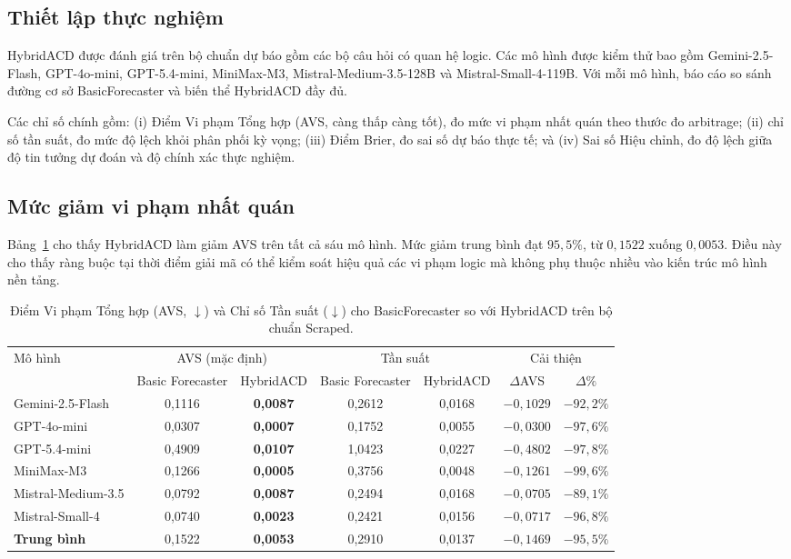 \documentclass[pdflatex,sn-mathphys-num,oneside]{sn-jnl}
\begin{document}
\subsection{Thiết lập thực nghiệm}

HybridACD được đánh giá trên bộ chuẩn dự báo gồm các bộ câu hỏi có quan hệ logic. Các mô hình được kiểm thử bao gồm Gemini-2.5-Flash, GPT-4o-mini, GPT-5.4-mini, MiniMax-M3, Mistral-Medium-3.5-128B và Mistral-Small-4-119B. Với mỗi mô hình, báo cáo so sánh đường cơ sở BasicForecaster và biến thể HybridACD đầy đủ.

Các chỉ số chính gồm: (i) Điểm Vi phạm Tổng hợp (AVS, càng thấp càng tốt), đo mức vi phạm nhất quán theo thước đo arbitrage; (ii) chỉ số tần suất, đo mức độ lệch khỏi phân phối kỳ vọng; (iii) Điểm Brier, đo sai số dự báo thực tế; và (iv) Sai số Hiệu chỉnh, đo độ lệch giữa độ tin tưởng dự đoán và độ chính xác thực nghiệm.

\subsection{Mức giảm vi phạm nhất quán}

Bảng~\ref{tab:avs_results} cho thấy HybridACD làm giảm AVS trên tất cả sáu mô hình. Mức giảm trung bình đạt $95,5\%$, từ $0,1522$ xuống $0,0053$. Điều này cho thấy ràng buộc tại thời điểm giải mã có thể kiểm soát hiệu quả các vi phạm logic mà không phụ thuộc nhiều vào kiến trúc mô hình nền tảng.

\begin{table}[h]
\caption{Điểm Vi phạm Tổng hợp (AVS, $\downarrow$) và Chỉ số Tần suất ($\downarrow$)
  cho BasicForecaster so với HybridACD trên bộ chuẩn Scraped.}
\label{tab:avs_results}
\begin{tabular}{@{}lcccccc@{}}
\toprule
\multirow{2}{*}{Mô hình} &
  \multicolumn{2}{c}{AVS (mặc định)} &
  \multicolumn{2}{c}{Tần suất} &
  \multicolumn{2}{c}{Cải thiện} \\
\cmidrule(lr){2-3}\cmidrule(lr){4-5}\cmidrule(lr){6-7}
& Basic Forecaster & HybridACD & Basic Forecaster & HybridACD & $\Delta$AVS & $\Delta\%$ \\
\midrule
Gemini-2.5-Flash      & 0,1116 & \textbf{0,0087} & 0,2612 & 0,0168 & $-0,1029$ & $-92,2\%$ \\
GPT-4o-mini           & 0,0307 & \textbf{0,0007} & 0,1752 & 0,0055 & $-0,0300$ & $-97,6\%$ \\
GPT-5.4-mini          & 0,4909 & \textbf{0,0107} & 1,0423 & 0,0227 & $-0,4802$ & $-97,8\%$ \\
MiniMax-M3            & 0,1266 & \textbf{0,0005} & 0,3756 & 0,0048 & $-0,1261$ & $-99,6\%$ \\
Mistral-Medium-3.5    & 0,0792 & \textbf{0,0087} & 0,2494 & 0,0168 & $-0,0705$ & $-89,1\%$ \\
Mistral-Small-4       & 0,0740 & \textbf{0,0023} & 0,2421 & 0,0156 & $-0,0717$ & $-96,8\%$ \\
\midrule
\textbf{Trung bình}   & 0,1522 & \textbf{0,0053} & 0,2910 & 0,0137 & $-0,1469$ & $-95,5\%$ \\
\bottomrule
\end{tabular}
\end{table}
\end{document}

